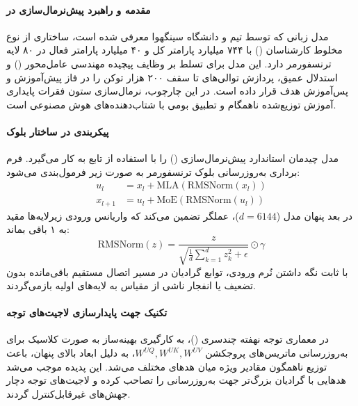 \item {}

\paragraph*{مقدمه و راهبرد پیش‌نرمال‌سازی در }
مدل زبانی  \cite{zeng2026glm5} که توسط تیم  و دانشگاه سینگهوا معرفی شده است، ساختاری از نوع مخلوط کارشناسان () با ۷۴۴ میلیارد پارامتر کل و ۴۰ میلیارد پارامتر فعال در ۸۰ لایه ترنسفورمر دارد. این مدل برای تسلط بر وظایف پیچیده مهندسی عامل‌محور () و استدلال عمیق، پردازش توالی‌های تا سقف ۲۰۰ هزار توکن را در فاز پیش‌آموزش و پس‌آموزش هدف قرار داده است. در این چارچوب، نرمال‌سازی ستون فقرات پایداری آموزش توزیع‌شده ناهمگام و تطبیق بومی با شتاب‌دهنده‌های هوش مصنوعی است.

\paragraph*{پیکربندی  در ساختار بلوک}
مدل  چیدمان استاندارد پیش‌نرمال‌سازی () را با استفاده از تابع  به کار می‌گیرد. فرم برداری به‌روزرسانی بلوک ترنسفورمر به صورت زیر فرمول‌بندی می‌شود:
\begin{align}
    u_l &= x_l + \text{MLA}(\text{RMSNorm}(x_l)) \\
    x_{l+1} &= u_l + \text{MoE}(\text{RMSNorm}(u_l))
\end{align}
در بعد پنهان مدل ($d = 6144$)، عملگر  تضمین می‌کند که واریانس ورودی زیرلایه‌ها مقید به ۱ باقی بماند:
\begin{equation}
    \text{RMSNorm}(z) = \frac{z}{\sqrt{\frac{1}{d}\sum_{k=1}^d z_k^2 + \epsilon}} \odot \gamma
\end{equation}
با ثابت نگه داشتن نُرم ورودی، توابع گرادیان در مسیر اتصال مستقیم باقی‌مانده بدون تضعیف یا انفجار ناشی از مقیاس به لایه‌های اولیه بازمی‌گردند.

\paragraph*{تکنیک  جهت پایدارسازی لاجیت‌های توجه}
در معماری توجه نهفته چندسری ()، به کارگیری بهینه‌ساز  به صورت کلاسیک برای به‌روزرسانی ماتریس‌های پروجکشن $W^{UQ}, W^{UK}, W^{UV}$، به دلیل ابعاد بالای پنهان، باعث توزیع ناهمگون مقادیر ویژه میان هدهای مختلف می‌شد. این پدیده موجب می‌شد هدهایی با گرادیان بزرگ‌تر جهت به‌روزرسانی را تصاحب کرده و لاجیت‌های توجه دچار جهش‌های غیرقابل‌کنترل گردند.

